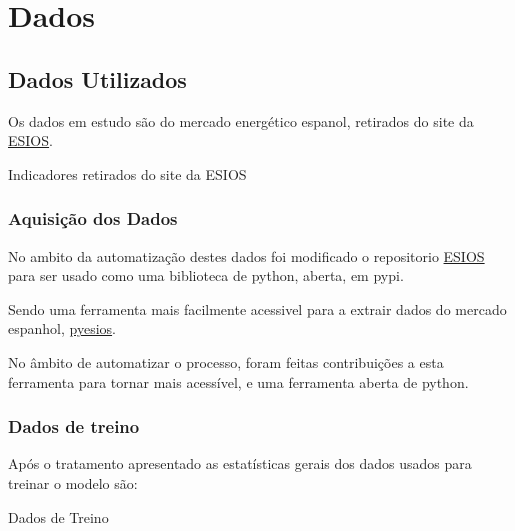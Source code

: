 
\chapter{Dados}
\section{Dados Utilizados\label{se:dadosestudo}}

Os dados em estudo são do mercado energético espanol, retirados do site da \href{https://www.esios.ree.es/es}{\gls{ESIOS}}.


\begin{table}[H]
    \caption{Indicadores retirados do site da ESIOS}    
\end{table}


\subsection{Aquisição dos Dados}

No ambito da automatização destes dados foi modificado o repositorio \href{https://github.com/SanPen/\gls{ESIOS}}{\gls{ESIOS}} para ser usado como uma biblioteca de python, aberta, em pypi.\par
Sendo uma ferramenta mais facilmente acessivel para a extrair dados do mercado espanhol, \href{https://pypi.org/project/pyesios/}{pyesios}.\par
No âmbito de automatizar o processo, foram feitas contribuições a esta ferramenta para tornar mais acessível, e uma ferramenta aberta de python.\par


\thispagestyle{plain}
 \label{se:dadoscrus}



\thispagestyle{plain}
 \label{se:tratamentodados}

\subsection{Dados de treino}

Após o tratamento apresentado as estatísticas gerais dos dados usados para treinar o modelo são:

\begin{table}[H]
    \caption{Dados de Treino}    
    \resizebox{\linewidth}{!}{}
    \end{table}
